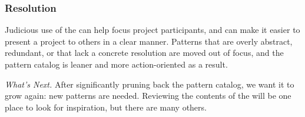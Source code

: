\subsubsection*{Resolution} 
Judicious use of the  can help focus project participants, and can make it easier to present a project to others in a clear manner.  Patterns that are overly abstract, redundant, or that lack a concrete resolution are moved out of focus, and the pattern catalog is leaner and more action-oriented as a result.

\begin{framed}
\emph{What's Next.}
After significantly pruning back the pattern catalog, we want it to grow again: new patterns are needed.  Reviewing the contents of the  will be one place to look for inspiration, but there are many others.
\end{framed}

\endgroup
